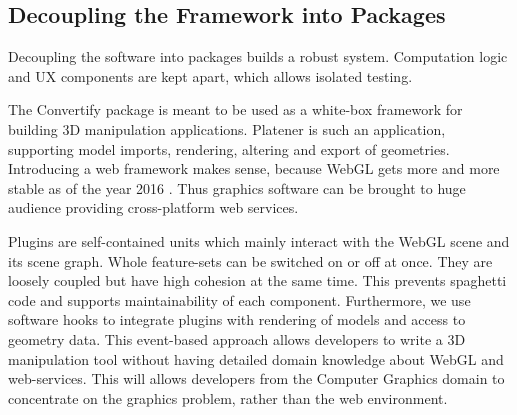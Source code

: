 \documentclass[../ClassicThesis.tex]{subfiles}
\begin{document}
\subsection{Decoupling the Framework into Packages}

Decoupling the software into packages builds a robust system. Computation logic
and UX components are kept apart, which allows isolated testing.

The Convertify package is meant to be used as a white-box framework for building
3D manipulation applications. Platener is such an application, supporting model
imports, rendering, altering and export of geometries. Introducing a web
framework makes sense, because WebGL gets more and more stable as of the year
2016 . Thus graphics software can be brought to huge
audience providing cross-platform web services.


Plugins are self-contained units which mainly interact with the WebGL scene and
its scene graph. Whole feature-sets can be switched on or off at once. They are
loosely coupled but have high cohesion at the same time. This prevents spaghetti
code and supports maintainability of each component. Furthermore, we use
software hooks to integrate plugins with rendering of models and access to
geometry data. This event-based approach allows developers to write a 3D
manipulation tool without having detailed domain knowledge about WebGL and
web-services. This will allows developers from the Computer Graphics domain to
concentrate on the graphics problem, rather than the web environment.
\end{document}
